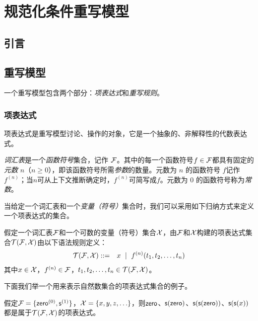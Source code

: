 \chapter{规范化条件重写模型}
\label{cha:normalrewriting}

\section{引言}


\section{重写模型} 

一个重写模型包含两个部分：\emph{项表达式}和\emph{重写规则}。

\subsection{项表达式}

项表达式是重写模型讨论、操作的对象，它是一个抽象的、非解释性的代数表达式。

\emph{词汇表}是一个\emph{函数符号}集合，记作 $\mathcal{F}$。其中的每一个函数符号$f\in\mathcal{F}$都具有固定的\emph{元数} $n$（$n\ge 0$），即该函数符号所需\emph{参数}的数量。元数为 $n$ 的函数符号 $f$记作$f^{(n)}$；当$n$可从上下文推断确定时，$f^{(n)}$可简写成$f$。元数为 $0$ 的函数符号称为\emph{常数}。

当给定一个词汇表和一个\emph{变量（符号）}集合时，我们可以采用如下归纳方式来定义一个项表达式的集合。

\begin{definition}[项表达式]
\label{d:term}
假定一个词汇表$\mathcal{F}$和一个可数的变量（符号）集合$\mathcal{X}$，由$\mathcal{F}$和$\mathcal{X}$构建的项表达式集合$\mathcal{T}(\mathcal{F},\mathcal{X})$由以下语法规则定义：
\begin{eqnarray}
    \mathcal{T}(\mathcal{F},\mathcal{X}) & ::= & x ~\mid~ f^{(n)}(t_1,t_2,\ldots,t_n) \nonumber 
\end{eqnarray}
其中$x\in\mathcal{X}$，$f^{(n)}\in\mathcal{F}$，$t_1,t_2,\ldots,t_n\in\mathcal{T}(\mathcal{F},\mathcal{X})$。
\end{definition}

下面我们举一个用来表示自然数集合的项表达式集合的例子。

\begin{example}
\label{e:nat}
假定$\mathcal{F} = \{\operatorname{\mathsf{zero}}^{(0)}, \operatorname{\mathsf{s}}^{(1)}\}$，$\mathcal{X}=\{x,y,z,\ldots\}$，则$\operatorname{\mathsf{zero}}$、$\operatorname{\mathsf{s}}(\operatorname{\mathsf{zero}})$、$\operatorname{\mathsf{s}}(\operatorname{\mathsf{s}}(\operatorname{\mathsf{zero}}))$、$\operatorname{\mathsf{s}}(\operatorname{\mathsf{s}}(x))$都是属于$\mathcal{T}(\mathcal{F},\mathcal{X})$的项表达式。
\end{example}

